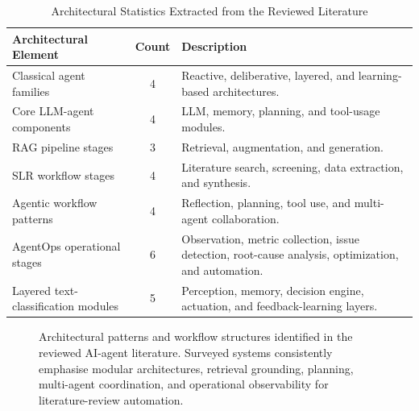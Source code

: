 \documentclass[sn-basic,Numbered]{sn-jnl}
\begin{document}
\begin{table}[t]
\centering
\caption{Architectural Statistics Extracted from the Reviewed Literature}
\label{tab:architecture_stats}
\begin{tabularx}{\linewidth}{@{}l c X@{}}
\toprule
\textbf{Architectural Element} & \textbf{Count} & \textbf{Description}
\\
\midrule
Classical agent families & 4 &
Reactive, deliberative, layered, and learning-based architectures. \\
Core LLM-agent components & 4 &
LLM, memory, planning, and tool-usage modules. \\
RAG pipeline stages & 3 &
Retrieval, augmentation, and generation. \\
SLR workflow stages & 4 &
Literature search, screening, data extraction, and synthesis. \\
Agentic workflow patterns & 4 &
Reflection, planning, tool use, and multi-agent collaboration. \\
AgentOps operational stages & 6 &
Observation, metric collection, issue detection, root-cause analysis,
optimization, and automation. \\
Layered text-classification modules & 5 &
Perception, memory, decision engine, actuation, and feedback-learning
layers. \\
\bottomrule
\end{tabularx}
\end{table}

\begin{figure}[t]
\centering
{}
\caption{Architectural patterns and workflow structures identified in the
reviewed AI-agent literature. Surveyed systems consistently emphasise
modular architectures, retrieval grounding, planning, multi-agent
coordination, and operational observability for literature-review
automation.}
\label{fig:architecture_stats}
\end{figure}
\end{document}
